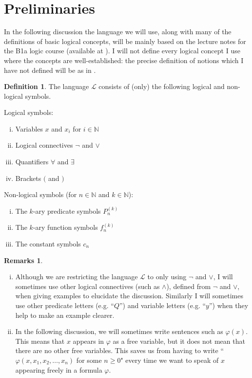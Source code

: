 \documentclass[a4paper,12pt]{report}
\theoremstyle{definition}
\newtheorem{mydef}[lem]{Definition}
\newtheorem{remarks}[lem]{Remarks}
\begin{document}
\section{Preliminaries}
\label{sec:prelim}

In the following discussion the language we will use, along with many of the definitions of basic logical concepts, will be mainly based on the lecture notes for the B1a logic course (available at \cite{logic10}). I will not define every logical concept I use where the concepts are well-established: the precise definition of notions which I have not defined will be as in \cite{logic10}.

\begin{mydef}
\label{def2.1.1}
The language $\mathcal{L}$ consists of (only) the following logical and non-logical symbols. 

\noindent Logical symbols:
\begin{enumerate}[(i)]
\item Variables $x$ and $x_{i}$ for $i \in \mathbb{N}$
\item Logical connectives $\neg$ and $\lor$
\item Quantifiers $\forall$ and $\exists$
\item Brackets $($ and $)$
\end{enumerate}

\noindent Non-logical symbols (for $n \in \mathbb{N}$ and $k \in \mathbb{N}$):
\begin{enumerate}[(i)]
\item The $k$-ary predicate symbols $P^{(k)}_n$
\item The $k$-ary function symbols $f^{(k)}_n$
\item The constant symbols $c_n$ 
\end{enumerate}
\end{mydef}

\begin{remarks}
\begin{enumerate}[(i)]
\item Although we are restricting the language $\mathcal{L}$ to only using $\neg$ and $\lor$, I will sometimes use other logical connectives (such as $\land$), defined from $\neg$ and $\lor$, when giving examples to elucidate the discussion. Similarly I will sometimes use other predicate letters (e.g. “$Q$”) and variable letters (e.g. “$y$”) when they help to make an example clearer.

\item In the following discussion, we will sometimes write sentences such as $\varphi(x)$. This means that $x$ appears in $\varphi$ as a free variable, but it does not mean that there are no other free variables. This saves us from having to write ``$\varphi(x, x_1, x_2, \ldots , x_n)$ for some $n \ge 0$" every time we want to speak of $x$ appearing freely in a formula $\varphi$.
\end{enumerate}
\end{remarks}
\end{document}
